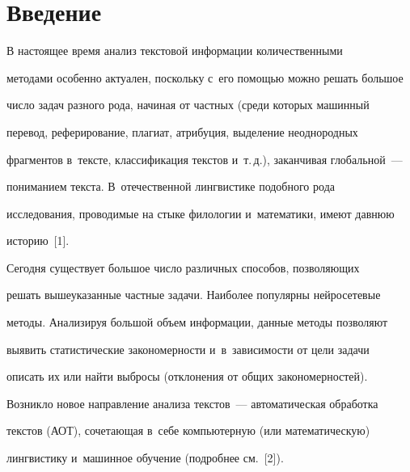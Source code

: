  \thispagestyle{headings}


 


 \vspace*{-16pt}


  


\section{Введение}





\vspace*{-2pt}








  В настоящее время анализ текстовой информации количественными 


методами особенно актуален, поскольку с~его помощью можно решать большое 


число задач разного рода, начиная от частных (среди которых машинный 


перевод, реферирование, плагиат, атрибуция, выделение неоднородных 


фрагментов в~тексте, классификация текстов и~т.\,д.), заканчивая глобальной~--- 


пониманием текста. В~отечественной лингвистике подобного рода 


исследования, проводимые на стыке филологии и~математики, имеют давнюю 


историю~[1]. 


  


  Сегодня существует большое число различных способов, позволяющих 


решать вышеуказанные частные задачи. Наиболее популярны нейросетевые 


методы. Анализируя большой объем информации, данные методы позволяют 


выявить статистические закономерности и~в~зависимости от цели задачи 


описать их или найти выбросы (отклонения от общих закономерностей). 


Возникло новое на\-прав\-ле\-ние анализа текстов~--- автоматическая обработка 


текстов (АОТ), сочетающая в~себе компьютерную (или математическую) 


лингвистику и~машинное обучение (подробнее см.~[2]).


